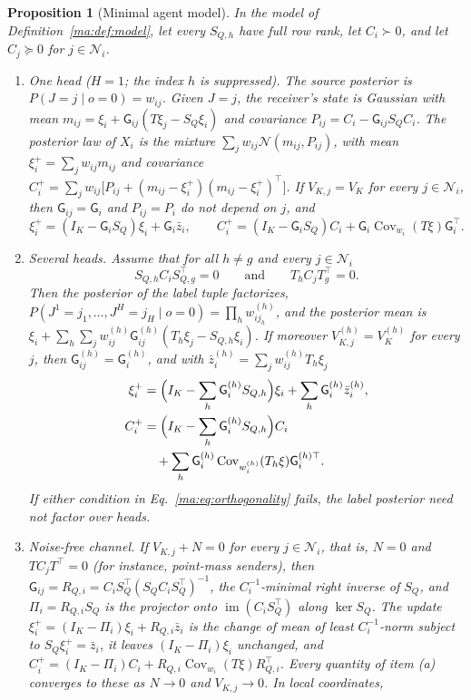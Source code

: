 \documentclass[11pt]{article}
\newtheorem{proposition}[theorem]{Proposition}
\theoremstyle{definition}
\theoremstyle{remark}
\newcommand{\Nset}{\mathcal N}
\newcommand{\Gauss}{\mathcal N}
\newcommand{\G}{\mathsf G}
\newcommand{\Cov}{\operatorname{Cov}}
\newcommand{\im}{\operatorname{im}}
\begin{document}
\begin{proposition}[Minimal agent model]
\label{ma:prop:minimal}
In the model of Definition~\ref{ma:def:model}, let every $S_{Q,h}$ have full row rank, let $C_i\succ0$, and let $C_j\succeq0$ for $j\in\Nset_i$.
\begin{enumerate}
\item[(a)] One head ($H=1$; the index $h$ is suppressed). The source posterior is $P(J=j\mid o=0)=w_{ij}$. Given $J=j$, the receiver's state is Gaussian with mean $m_{ij}=\xi_i+\G_{ij}(T\xi_j-S_Q\xi_i)$ and covariance $P_{ij}=C_i-\G_{ij}S_QC_i$. The posterior law of $X_i$ is the mixture $\sum_jw_{ij}\Gauss(m_{ij},P_{ij})$, with mean $\xi_i^+=\sum_jw_{ij}m_{ij}$ and covariance $C_i^+=\sum_jw_{ij}\bigl[P_{ij}+(m_{ij}-\xi_i^+)(m_{ij}-\xi_i^+)^\top\bigr]$. If $V_{K,j}=V_K$ for every $j\in\Nset_i$, then $\G_{ij}=\G_i$ and $P_{ij}=P_i$ do not depend on $j$, and
\begin{equation}
\xi_i^+=(I_K-\G_iS_Q)\xi_i+\G_i\bar z_i,\qquad
C_i^+=(I_K-\G_iS_Q)C_i+\G_i\Cov_{w_i}(T\xi)\G_i^\top.
\label{ma:eq:update}
\end{equation}
\item[(b)] Several heads. Assume that for all $h\ne g$ and every $j\in\Nset_i$
\begin{equation}
S_{Q,h}C_iS_{Q,g}^\top=0\qquad\text{and}\qquad T_hC_jT_g^\top=0.
\label{ma:eq:orthogonality}
\end{equation}
Then the posterior of the label tuple factorizes, $P(J^1=j_1,\ldots,J^H=j_H\mid o=0)=\prod_hw^{(h)}_{ij_h}$, and the posterior mean is $\xi_i+\sum_h\sum_jw^{(h)}_{ij}\G^{(h)}_{ij}(T_h\xi_j-S_{Q,h}\xi_i)$. If moreover $V^{(h)}_{K,j}=V^{(h)}_K$ for every $j$, then $\G^{(h)}_{ij}=\G^{(h)}_i$, and with $\bar z^{(h)}_i=\sum_jw^{(h)}_{ij}T_h\xi_j$
\begin{equation}
\begin{aligned}
\xi_i^+&=\Bigl(I_K-\sum_h\G^{(h)}_iS_{Q,h}\Bigr)\xi_i+\sum_h\G^{(h)}_i\bar z^{(h)}_i,\\
C_i^+&=\Bigl(I_K-\sum_h\G^{(h)}_iS_{Q,h}\Bigr)C_i\\
&\quad+\sum_h\G^{(h)}_i\Cov_{w^{(h)}_i}(T_h\xi)\G^{(h)\top}_i.
\end{aligned}
\label{ma:eq:multihead}
\end{equation}
If either condition in Eq.~\eqref{ma:eq:orthogonality} fails, the label posterior need not factor over heads.
\item[(c)] Noise-free channel. If $V_{K,j}+N=0$ for every $j\in\Nset_i$, that is, $N=0$ and $TC_jT^\top=0$ (for instance, point-mass senders), then $\G_{ij}=R_{Q,i}=C_iS_Q^\top(S_QC_iS_Q^\top)^{-1}$, the $C_i^{-1}$-minimal right inverse of $S_Q$, and $\Pi_i=R_{Q,i}S_Q$ is the projector onto $\im(C_iS_Q^\top)$ along $\ker S_Q$. The update $\xi_i^+=(I_K-\Pi_i)\xi_i+R_{Q,i}\bar z_i$ is the change of mean of least $C_i^{-1}$-norm subject to $S_Q\xi_i^+=\bar z_i$, it leaves $(I_K-\Pi_i)\xi_i$ unchanged, and $C_i^+=(I_K-\Pi_i)C_i+R_{Q,i}\Cov_{w_i}(T\xi)R_{Q,i}^\top$. Every quantity of item (a) converges to these as $N\to0$ and $V_{K,j}\to0$. In local coordinates,

\end{enumerate}
\end{proposition}
\end{document}
